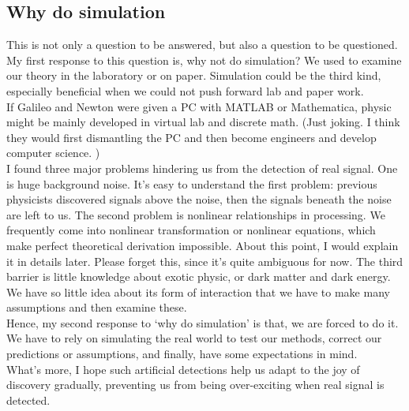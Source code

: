 \documentclass[
12pt, %
a4paper %
]{extreport}
\theoremstyle{plain}
\begin{document}
\subsection{Why do simulation}
This is not only a question to be answered, but also a question to be questioned. My first response to this question is, why not do simulation? We used to examine our theory in the laboratory or on paper. Simulation could be the third kind, especially beneficial when we could not push forward lab and paper work.\\
If Galileo and Newton were given a PC with MATLAB or Mathematica, physic might be mainly developed in virtual lab and discrete math. (Just joking. I think they would first dismantling the PC and then become engineers and develop computer science. )\\
I found three major problems hindering us from the detection of real signal. One is huge background noise. It’s easy to understand the first problem: previous physicists discovered signals above the noise, then the signals beneath the noise are left to us. The second problem is nonlinear relationships in processing. We frequently come into nonlinear transformation or nonlinear equations, which make perfect theoretical derivation impossible. About this point, I would explain it in details later. Please forget this, since it’s quite ambiguous for now. The third barrier is little knowledge about exotic physic, or dark matter and dark energy. We have so little idea about its form of interaction that we have to make many assumptions and then examine these.\\
Hence, my second response to ‘why do simulation’ is that, we are forced to do it. We have to rely on simulating the real world to test our methods, correct our predictions or assumptions, and finally, have some expectations in mind.\\
What’s more, I hope such artificial detections help us adapt to the joy of discovery gradually, preventing us from being over-exciting when real signal is detected.
\end{document}
